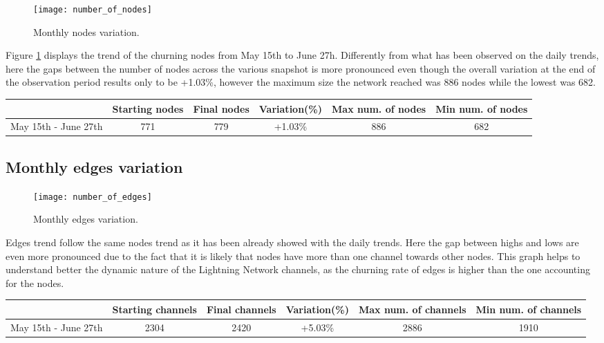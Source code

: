 	\begin{figure}
		\centering
		\texttt{[image: number\_of\_nodes]}
		\caption{Monthly nodes variation.}
		\label{monthly_nodes}
	\end{figure}
	
	Figure \ref{monthly_nodes} displays the trend of the churning nodes from May 15th to June 27h. Differently from what has been observed on the daily trends, here the gaps between the number of nodes across the various snapshot is more pronounced even though the overall variation at the end of the observation period results only to be +1.03\%, however the maximum size the network reached was 886 nodes while the lowest was 682.
	
	\begin{center}
		\begin{tabulary}{\linewidth}{| L | C | C | C | C | C |}
			\hline	
			& Starting nodes & Final nodes  & Variation(\%) & Max num. of nodes & Min num. of nodes \\ \hline
			May 15th - June 27th & 771 & 779 & +1.03\% & 886 & 682 \\ \hline
		\end{tabulary}
	\end{center}
	
	\subsection{Monthly edges variation}
	\begin{figure}
		\centering
		\texttt{[image: number\_of\_edges]}
		\caption{Monthly edges variation.}
		\label{monthly_edges}
	\end{figure}

	Edges trend follow the same nodes trend as it has been already showed with the daily trends. Here the gap between highs and lows are even more pronounced due to the fact that it is likely that nodes have more than one channel towards other nodes. This graph helps to understand better the dynamic nature of the Lightning Network channels, as the churning rate of edges is higher than the one accounting for the nodes. 
	
	\begin{center}
		\begin{tabulary}{\linewidth}{| L | C | C | C | C | C |}
			\hline	
			& Starting channels & Final channels  & Variation(\%) & Max num. of channels & Min num. of channels \\ \hline
			May 15th - June 27th & 2304 & 2420 & +5.03\% & 2886 & 1910 \\ \hline
		\end{tabulary}
	\end{center}
	
